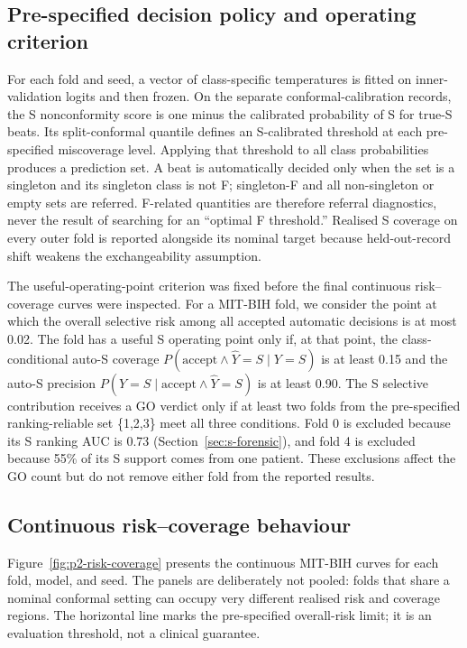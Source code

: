 \documentclass[review,12pt]{elsarticle}
\begin{document}
\subsection{Pre-specified decision policy and operating criterion}
For each fold and seed, a vector of class-specific temperatures is fitted on
inner-validation logits and then frozen. On the separate conformal-calibration
records, the S nonconformity score is one minus the calibrated probability of S
for true-S beats. Its split-conformal quantile defines an S-calibrated threshold
at each pre-specified miscoverage level. Applying that threshold to all class
probabilities produces a prediction set. A beat is automatically decided only
when the set is a singleton and its singleton class is not F; singleton-F and
all non-singleton or empty sets are referred. F-related quantities are therefore
referral diagnostics, never the result of searching for an ``optimal F
threshold.'' Realised S coverage on every outer fold is reported alongside its
nominal target because held-out-record shift weakens the exchangeability assumption.

The useful-operating-point criterion was fixed before the final continuous
risk--coverage curves were inspected. For a MIT-BIH fold, we consider the point
at which the overall selective risk among all accepted automatic decisions is
at most 0.02. The fold has a useful S operating point only if, at that point,
the class-conditional auto-S coverage
$P(\mathrm{accept}\land\widehat{Y}=S\mid Y=S)$ is at least 0.15 and the auto-S
precision $P(Y=S\mid\mathrm{accept}\land\widehat{Y}=S)$ is at least 0.90.
The S selective contribution receives a GO verdict only if at least two folds
from the pre-specified ranking-reliable set \{1,2,3\} meet all three conditions.
Fold 0 is excluded because its S ranking AUC is 0.73
(Section~\ref{sec:s-forensic}), and fold 4 is excluded
because 55\% of its S support comes from one patient. These exclusions affect
the GO count but do not remove either fold from the reported results.
\subsection{Continuous risk--coverage behaviour}
Figure~\ref{fig:p2-risk-coverage} presents the continuous MIT-BIH curves for
each fold, model, and seed. The panels are deliberately not pooled: folds that
share a nominal conformal setting can occupy very different realised risk and
coverage regions. The horizontal line marks the pre-specified overall-risk
limit; it is an evaluation threshold, not a clinical guarantee.
\end{document}
